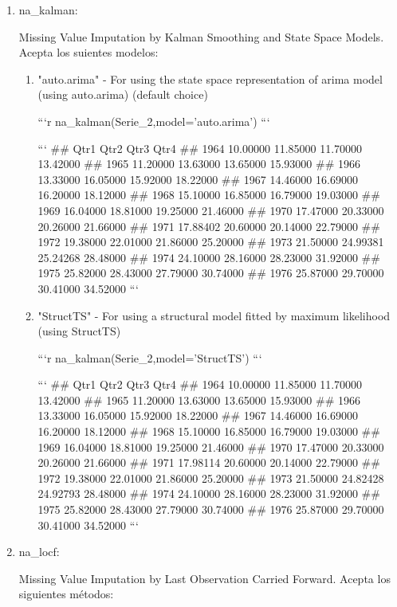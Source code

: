 \documentclass[
]{article}
\begin{document}
\begin{enumerate}
\begin{enumerate}
\end{enumerate}

\item

na\_kalman:

Missing Value Imputation by Kalman Smoothing and State Space Models.
Acepta los suientes modelos:

\begin{enumerate}
\item "auto.arima" - For using the state space representation of arima model (using auto.arima) (default choice)

```r
na_kalman(Serie_2,model='auto.arima')
```

```
##          Qtr1     Qtr2     Qtr3     Qtr4
## 1964 10.00000 11.85000 11.70000 13.42000
## 1965 11.20000 13.63000 13.65000 15.93000
## 1966 13.33000 16.05000 15.92000 18.22000
## 1967 14.46000 16.69000 16.20000 18.12000
## 1968 15.10000 16.85000 16.79000 19.03000
## 1969 16.04000 18.81000 19.25000 21.46000
## 1970 17.47000 20.33000 20.26000 21.66000
## 1971 17.88402 20.60000 20.14000 22.79000
## 1972 19.38000 22.01000 21.86000 25.20000
## 1973 21.50000 24.99381 25.24268 28.48000
## 1974 24.10000 28.16000 28.23000 31.92000
## 1975 25.82000 28.43000 27.79000 30.74000
## 1976 25.87000 29.70000 30.41000 34.52000
```

\item "StructTS" - For using a structural model fitted by maximum likelihood (using StructTS)

```r
na_kalman(Serie_2,model='StructTS')
```

```
##          Qtr1     Qtr2     Qtr3     Qtr4
## 1964 10.00000 11.85000 11.70000 13.42000
## 1965 11.20000 13.63000 13.65000 15.93000
## 1966 13.33000 16.05000 15.92000 18.22000
## 1967 14.46000 16.69000 16.20000 18.12000
## 1968 15.10000 16.85000 16.79000 19.03000
## 1969 16.04000 18.81000 19.25000 21.46000
## 1970 17.47000 20.33000 20.26000 21.66000
## 1971 17.98114 20.60000 20.14000 22.79000
## 1972 19.38000 22.01000 21.86000 25.20000
## 1973 21.50000 24.82428 24.92793 28.48000
## 1974 24.10000 28.16000 28.23000 31.92000
## 1975 25.82000 28.43000 27.79000 30.74000
## 1976 25.87000 29.70000 30.41000 34.52000
```
\end{enumerate}
\item

na\_locf:

Missing Value Imputation by Last Observation Carried Forward. Acepta los
siguientes métodos:

\begin{enumerate}


\end{enumerate}
\end{enumerate}
\end{document}
